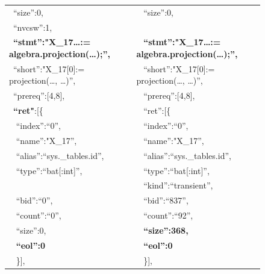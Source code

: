 \documentclass[conference]{IEEEtran}
\begin{document}
\begin{figure}[t]
{\begin{tabular}{|l@{~}l|}
 ~``size'':0,                                             &   ~ ``size'':0,                                              \\
 ~{\color{red}``nvcsw'':1,}                               &   ~                                                          \\
 ~\textbf{``stmt'':"X\_17…:= algebra.projection(…);'',}   &   ~ \textbf{``stmt'':"X\_17…:= algebra.projection(…);'',}    \\
 ~``short'':"X\_17[0]:= projection(…, …)'',               &   ~ ``short'':"X\_17[0]:= projection(…, …)'',                \\
 ~``prereq'':[4,8],                                       &   ~ ``prereq'':[4,8],                                        \\
 ~\textbf{``ret"}:[\{                                     &   ~ ``ret'':[\{                                              \\
 ~   ``index'':``0'',                                     &   ~    ``index'':``0'',                                      \\
 ~   ``name'':"X\_17'',                                   &   ~    ``name'':"X\_17'',                                    \\
 ~   ``alias'':``sys.\_tables.id'',                       &   ~    ``alias'':``sys.\_tables.id'',                        \\
 ~   ``type'':``bat[:int]'',                              &   ~    ``type'':``bat[:int]'',                               \\
 ~                                                        &   ~ {\color{red}``kind'':``transient'',}                     \\
 ~   {\color{red}``bid'':``0'',}                          &   ~    {\color{red}``bid'':``837'',}                         \\
 ~   {\color{red}``count'':``0'',}                        &   ~    {\color{red}``count'':``92'',}                        \\
 ~   {\color{red}``size'':0,}                             &   ~    \textbf{\color{red}``size'':368,}                     \\
 ~   \textbf{``eol'':0}                                   &   ~    \textbf{``eol'':0}                                    \\
 ~  \}],                                                  &   ~   \}],                                                   \\

\end{tabular}}
\end{figure}
\end{document}
